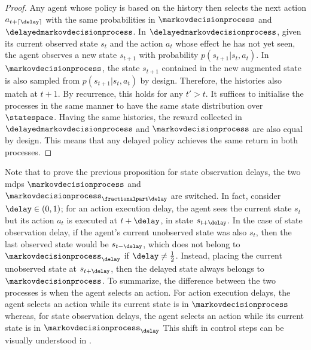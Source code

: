 \begin{proof}
    Any agent whose policy is based on the history then selects the next action $a_{t+\lceil\delay\rceil}$ with the same probabilities in $\markovdecisionprocess$ and $\delayedmarkovdecisionprocess$.
    In $\delayedmarkovdecisionprocess$, given its current observed state $s_t$ and the action $a_{t}$ whose effect he has not yet seen, the agent observes a new state $s_{t+1}$ with probability $p(s_{t+1}\vert s_t,a_{t})$. 
    In $\markovdecisionprocess$, the state $s_{t+1}$ contained in the new augmented state is also sampled from $p(s_{t+1}\vert s_t,a_{t})$ by design. 
    Therefore, the histories also match at $t+1$. 
    By recurrence, this holds for any $t'>t$.
    It suffices to initialise the processes in the same manner to have the same state distribution over $\statespace$.
    Having the same histories, the reward collected in 
    $\delayedmarkovdecisionprocess$ and $\markovdecisionprocess$ are also equal by design.
    This means that any delayed policy achieves the same return in both processes.
\end{proof}

Note that to prove the previous proposition for state observation delays, the two \glspl{mdp} $\markovdecisionprocess$ and $\markovdecisionprocess_{\fractionalpart\delay}$ are switched.
In fact, consider $\delay\in(0,1)$; for an action execution delay, the agent sees the current state $s_t$ but its action $a_t$ is executed at $t+\delay$, in state $s_{t+\delay}$. 
In the case of state observation delay, if the agent's current unobserved state was also $s_t$, then the last observed state would be $s_{t-\delay}$, which does not belong to $\markovdecisionprocess_{\delay}$ if $\textstyle\delay\neq \frac{1}{2}$.
Instead, placing the current unobserved state at $s_{t+\delay}$, then the delayed state always belongs to $\markovdecisionprocess$.
To summarize, the difference between the two processes is when the agent selects an action. 
For action execution delays, the agent selects an action while its current state is in $\markovdecisionprocess$ whereas, for state observation delays, the agent selects an action while its current state is in $\markovdecisionprocess_{\delay}$
This shift in control steps can be visually understood in .

